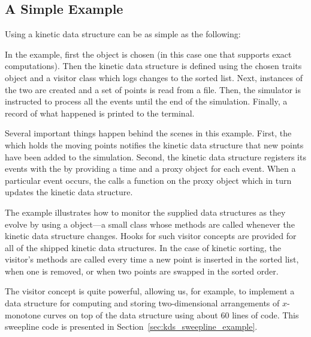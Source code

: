 \subsection{A Simple Example \label{sec:kds_sort_example}}


Using a kinetic data structure can be as simple as the following:
\label{fig:kds_sort_program}

In the example, first the  object is chosen
(in this case one that supports exact computations). Then the kinetic
data structure is defined using the chosen traits object and a
visitor class which logs changes to the sorted list.  Next, instances
of the two are created and a set of points is read from a file. Then,
the simulator is instructed to process all the events until the end of
the simulation.  Finally, a record of what happened is printed to the
terminal.

Several important things happen behind the scenes in this example.
First, the  which holds the moving
points notifies the kinetic data structure that new points have been
added to the simulation. Second, the
 kinetic data structure registers
its events with the  by providing a time and a
proxy object for each event. When a particular event occurs, the
 calls a function on the proxy object which in turn
updates the kinetic data structure.

The example illustrates how to monitor the supplied data structures as
they evolve by using a  object---a small class whose
methods are called whenever the kinetic data structure changes. Hooks
for such visitor concepts are provided for all of the shipped kinetic
data structures. In the case of kinetic sorting, the visitor's
methods are called every time a new point is inserted in the sorted
list, when one is removed, or when two points are swapped in the
sorted order. 


The visitor concept is quite powerful, allowing us, for example, to
implement a data structure for computing and storing two-dimensional
arrangements of $x$-monotone curves on top of the
 data structure using about 60
lines of code. This sweepline code is presented in
Section~\ref{sec:kds_sweepline_example}.



